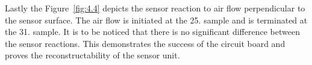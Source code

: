Lastly the Figure~\ref{fig:4.4} depicts the sensor reaction to air flow perpendicular to the sensor surface. The air flow is initiated at the 25. sample and is terminated at the 31. sample. It is to be noticed that there is no significant difference between the sensor reactions. This demonstrates the success of the circuit board and proves the reconstructability of the sensor unit.  








